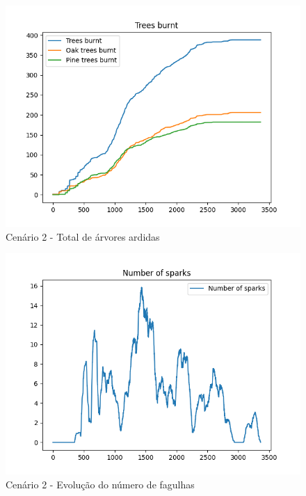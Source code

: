 \begin{figure}[H]
    \centering
    \includegraphics[width=\textwidth]{src/runs/scenario2/trees_burnt.png}
    \caption{Cenário 2 - Total de árvores ardidas}
    \label{fig:S2TreesBurnt}
\end{figure}

\begin{figure}[H]
    \centering
    \includegraphics[width=\textwidth]{src/runs/scenario2/sparks.png}
    \caption{Cenário 2 - Evolução do número de fagulhas}
    \label{fig:S2Sparks}
\end{figure}

